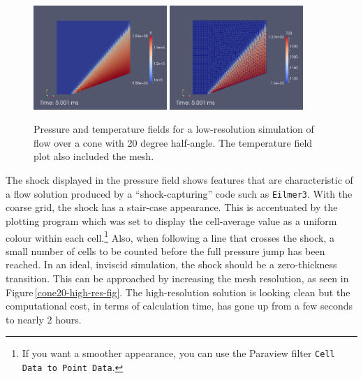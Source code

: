 \begin{figure}[htbp]
\begin{center}
\includegraphics[width=0.45\textwidth]{../2D/cone20-simple/cone20_p.png}
\includegraphics[width=0.45\textwidth]{../2D/cone20-simple/cone20_T0_with-mesh.png}
\end{center}
\caption{Pressure and temperature fields for a low-resolution simulation 
         of flow over a cone with 20 degree half-angle.
         The temperature field plot also included the mesh.}
\label{cone20-low-res-fig}
\end{figure}


\medskip
The shock displayed in the pressure field shows features that are characteristic 
of a flow solution produced by a ``shock-capturing'' code such as \verb!Eilmer3!.
With the coarse grid, the shock has a stair-case appearance.
This is accentuated by the plotting program which was set to display 
the cell-average value as a uniform colour within each cell.\footnote{
If you want a smoother appearance, you can use the Paraview filter \texttt{Cell Data to Point Data}.}
Also, when following a line that crosses the shock,
a small number of cells to be counted before the full pressure jump has been reached.
In an ideal, inviscid simulation, the shock should be a zero-thickness transition.
This can be approached by increasing the mesh resolution, as seen in Figure\,\ref{cone20-high-res-fig}.
The high-resolution solution is looking clean but the computational cost, in terms of calculation time, 
has gone up from a few seconds to nearly 2 hours.

